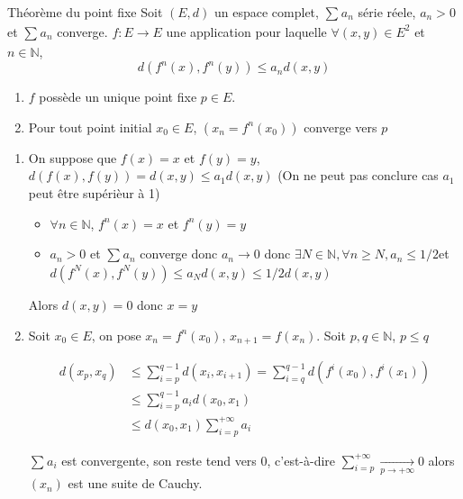 \begin{question}{Théorème du point fixe}{}
Soit $(E, d)$ un espace complet, $\sum_{}^{}a_n$ série réele, $a_n >0$ et $\sum_{}^{}a_n$ converge. $f : E \to E$ une application pour laquelle $\forall(x,y) \in E ^{2}$ et $n \in \mathbb{N}$, 
\[
  d(f ^{n}(x) , f ^{n}(y)) \le a_n d(x, y)
\]
\begin{enumerate}

    \item $f$ possède un unique point fixe $p \in E$.
    \item Pour tout point initial $x_0 \in E$, $(x_n= f ^{n}(x_0))$ converge vers $p$

\end{enumerate}\end{question}

\begin{myproof}{}{}
\begin{enumerate}

    \item On suppose que $f(x) = x$ et $f(y) =y$, $d(f(x), f(y)) = d(x, y) \le a_1 d(x, y)$ (On ne peut pas conclure cas $a_1$ peut être supérièur à 1)

      \begin{itemize}

          \item $\forall n \in \mathbb{N}$, $f ^{n}(x) = x$ et $f ^{n}(y)=y$
          \item $a_n > 0$ et $\sum_{}^{}a_n$ converge donc $a_n \to 0$ donc $\exists N \in \mathbb{N}, \forall n \ge N, a_n \le 1/2$et $d(f ^{N}(x) , f ^{N}(y)) \le a_N d(x, y) \le 1 / 2 d(x, y)$

      \end{itemize}

      Alors $d(x, y) = 0$ donc $x= y$

    \item Soit $x_0 \in E$, on pose $x_n = f ^{n}(x_0)$, $x _{n+1} = f(x_n)$. Soit $p, q \in \mathbb{N}$, $p \le q$ 

      \begin{align*}
        d(x_p, x_q) &\le \sum_{i= p}^{q-1} d(x_i , x _{i+1}) = \sum_{i= q}^{q-1} d(f ^{i}(x_0), f ^{i}(x_1)) \\
                    &\le \sum_{i= p}^{q-1} a_i d(x_0, x_1) \\ 
                    &\le d(x_0, x_1) \sum_{i = p}^{+ \infty} a_i
      \end{align*}

      $\sum_{}^{} a_i$ est convergente, son reste tend vers 0, c'est-à-dire $\sum_{i=p}^{+ \infty} \underset{p \to + \infty}{\longrightarrow} 0$ alors $(x_n)$ est une suite de Cauchy.
      

\end{enumerate}
\end{myproof}
